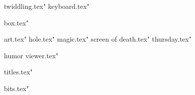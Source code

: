  twiddling.tex"
 keyboard.tex"




 box.tex"


 art.tex"
 hole.tex"
 magic.tex"
 screen of death.tex"
 thursday.tex"




 humor viewer.tex"






 titles.tex"






 bits.tex"



